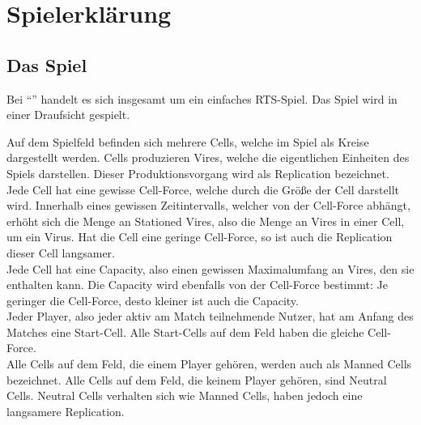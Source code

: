 \section{Spielerklärung}
\label{sec:spielerklaerung}

\subsection{Das Spiel}
Bei ``\vires'' handelt es sich insgesamt um ein einfaches RTS-Spiel. 
Das Spiel wird in einer Draufsicht gespielt.

Auf dem Spielfeld befinden sich mehrere Cells, welche im Spiel als Kreise dargestellt werden.
Cells produzieren Vires, welche die eigentlichen Einheiten des Spiels darstellen. Dieser Produktionsvorgang wird als Replication bezeichnet. \\
Jede Cell hat eine gewisse Cell-Force, welche durch die Größe der Cell darstellt wird.
Innerhalb eines gewissen Zeitintervalls, welcher von der Cell-Force abhängt, erhöht sich die Menge an Stationed Vires, also die Menge an Vires in einer Cell, um ein Virus.
Hat die Cell eine geringe Cell-Force, so ist auch die Replication dieser Cell langsamer. \\
Jede Cell hat eine Capacity, also einen gewissen Maximalumfang an Vires, den sie enthalten kann.
Die Capacity wird ebenfalls von der Cell-Force bestimmt: Je geringer die Cell-Force, desto kleiner ist auch die Capacity. \\
Jeder Player, also jeder aktiv am Match teilnehmende Nutzer, hat am Anfang des Matches eine Start-Cell. 
Alle Start-Cells auf dem Feld haben die gleiche Cell-Force. \\
Alle Cells auf dem Feld, die einem Player gehören, werden auch als Manned Cells bezeichnet.
Alle Cells auf dem Feld, die keinem Player gehören, sind Neutral Cells. Neutral Cells verhalten sich wie Manned Cells, haben jedoch eine langsamere Replication.

